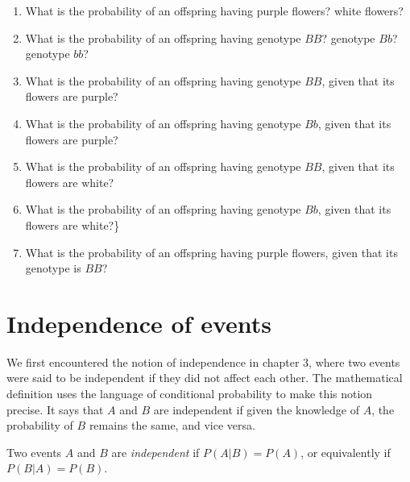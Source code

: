\documentclass[
  letterpaper,
  DIV=11,
  numbers=noendperiod]{scrreprt}
\begin{document}
\begin{enumerate}
\def\labelenumi{\arabic{enumi}.}
\item
  What is the probability of an offspring having purple flowers? white
  flowers?
\item
  What is the probability of an offspring having genotype \(BB\)?
  genotype \(Bb\)? genotype \(bb\)?
\item
  What is the probability of an offspring having genotype \(BB\), given
  that its flowers are purple?
\item
  What is the probability of an offspring having genotype \(Bb\), given
  that its flowers are purple?
\item
  What is the probability of an offspring having genotype \(BB\), given
  that its flowers are white?
\item
  What is the probability of an offspring having genotype \(Bb\), given
  that its flowers are white?\}
\item
  What is the probability of an offspring having purple flowers, given
  that its genotype is \(BB\)?
\end{enumerate}

\hypertarget{independence-of-events}{%
\section{Independence of events}\label{independence-of-events}}

We first encountered the notion of independence in chapter 3, where two
events were said to be independent if they did not affect each other.
The mathematical definition uses the language of conditional probability
to make this notion precise. It says that \(A\) and \(B\) are
independent if given the knowledge of \(A\), the probability of \(B\)
remains the same, and vice versa.

\begin{tcolorbox}[enhanced jigsaw, coltitle=black, arc=.35mm, opacitybacktitle=0.6, breakable, bottomtitle=1mm, toptitle=1mm, titlerule=0mm, colback=white, leftrule=.75mm, rightrule=.15mm, colframe=quarto-callout-note-color-frame, colbacktitle=quarto-callout-note-color!10!white, opacityback=0, title=\textcolor{quarto-callout-note-color}{\faInfo}\hspace{0.5em}{Definition}, left=2mm, toprule=.15mm, bottomrule=.15mm]

Two events \(A\) and \(B\) are \emph{independent} if \(P(A|B) = P(A)\),
or equivalently if \(P(B|A) = P(B)\).

\end{tcolorbox}
\end{document}
